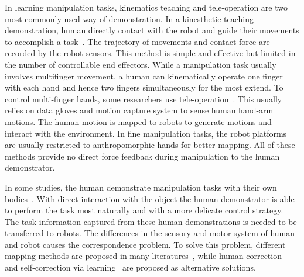 In learning manipulation tasks, kinematics teaching and tele-operation are two most commonly used way of demonstration. In a kinesthetic teaching demonstration, human directly contact with the robot and guide their movements to accomplish a task~\cite{korkinof2013online,pais2014encoding,pastor2011skill,Miao2014}. The trajectory of movements and contact force are recorded by the robot sensors.
This method is simple and effective but limited in the number of controllable end effectors. While a manipulation task usually involves multifinger movement, a human can kinematically operate one finger with each hand and hence two fingers simultaneously for the most extend. To control multi-finger hands, some researchers use tele-operation~\cite{bernardino2013precision,kondo2008recognition,Fischer98}. This usually relies on data gloves and motion capture system to sense human hand-arm motions. The human motion is mapped to robots to generate motions and interact with the environment. In fine manipulation tasks, the robot platforms are usually restricted to anthropomorphic hands for better mapping. All of these methods provide no direct force feedback during manipulation to the human demonstrator.

In some studies, the human demonstrate manipulation tasks with their own bodies~\cite{asfour2008imitation}. With direct interaction with the object the human demonstrator is able to perform the task most naturally and with a more delicate control strategy. The task information captured from these human demonstrations is needed to be transferred to robots. The differences in the sensory and motor system of human and robot causes the correspondence problem. To solve this problem, different mapping methods are proposed in many literatures~\cite{do2011towards,asfour2008imitation,hueser2006learning}, while human correction~\cite{calinon2007incremental,sauser2011iterative,romano2011human} and self-correction via learning~\cite{bidan2013robio} are proposed as alternative solutions.

